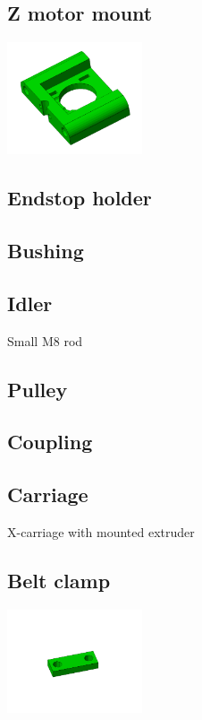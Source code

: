\documentclass[11pt]{article}
\begin{document}
\hypertarget{thing_z-motor-mount}{\subsection{Z motor mount}}
\includegraphics[width=4cm]{images/z-motor-mount.jpg}

\hypertarget{thing_endstop-holder}{\subsection{Endstop holder}}

\hypertarget{thing_bushing}{\subsection{Bushing}}

\hypertarget{thing_idler-m8-piece}{\subsection{Idler}}
Small M8 rod

\hypertarget{thing_pulley}{\subsection{Pulley}}

\hypertarget{thing_coupling}{\subsection{Coupling}}

\hypertarget{thing_carriage}{\subsection{Carriage}}
X-carriage with mounted extruder

\hypertarget{thing_belt-clamp}{\subsection{Belt clamp}}
\includegraphics[width=4cm]{images/belt-clamp.jpg}
\end{document}
